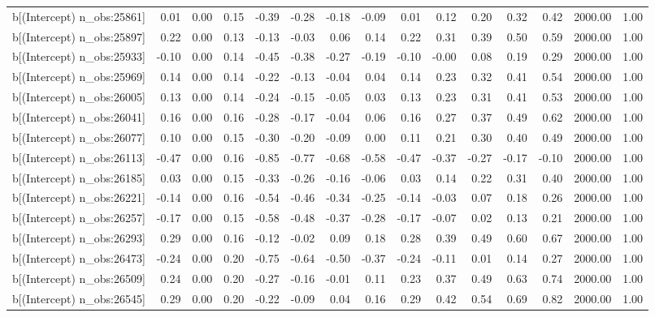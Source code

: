 \begin{table}[ht]
\begin{tabular}{rrrrrrrrrrrrrrr}
  b[(Intercept) n\_obs:25861] & 0.01 & 0.00 & 0.15 & -0.39 & -0.28 & -0.18 & -0.09 & 0.01 & 0.12 & 0.20 & 0.32 & 0.42 & 2000.00 & 1.00 \\ 
  b[(Intercept) n\_obs:25897] & 0.22 & 0.00 & 0.13 & -0.13 & -0.03 & 0.06 & 0.14 & 0.22 & 0.31 & 0.39 & 0.50 & 0.59 & 2000.00 & 1.00 \\ 
  b[(Intercept) n\_obs:25933] & -0.10 & 0.00 & 0.14 & -0.45 & -0.38 & -0.27 & -0.19 & -0.10 & -0.00 & 0.08 & 0.19 & 0.29 & 2000.00 & 1.00 \\ 
  b[(Intercept) n\_obs:25969] & 0.14 & 0.00 & 0.14 & -0.22 & -0.13 & -0.04 & 0.04 & 0.14 & 0.23 & 0.32 & 0.41 & 0.54 & 2000.00 & 1.00 \\ 
  b[(Intercept) n\_obs:26005] & 0.13 & 0.00 & 0.14 & -0.24 & -0.15 & -0.05 & 0.03 & 0.13 & 0.23 & 0.31 & 0.41 & 0.53 & 2000.00 & 1.00 \\ 
  b[(Intercept) n\_obs:26041] & 0.16 & 0.00 & 0.16 & -0.28 & -0.17 & -0.04 & 0.06 & 0.16 & 0.27 & 0.37 & 0.49 & 0.62 & 2000.00 & 1.00 \\ 
  b[(Intercept) n\_obs:26077] & 0.10 & 0.00 & 0.15 & -0.30 & -0.20 & -0.09 & 0.00 & 0.11 & 0.21 & 0.30 & 0.40 & 0.49 & 2000.00 & 1.00 \\ 
  b[(Intercept) n\_obs:26113] & -0.47 & 0.00 & 0.16 & -0.85 & -0.77 & -0.68 & -0.58 & -0.47 & -0.37 & -0.27 & -0.17 & -0.10 & 2000.00 & 1.00 \\ 
  b[(Intercept) n\_obs:26185] & 0.03 & 0.00 & 0.15 & -0.33 & -0.26 & -0.16 & -0.06 & 0.03 & 0.14 & 0.22 & 0.31 & 0.40 & 2000.00 & 1.00 \\ 
  b[(Intercept) n\_obs:26221] & -0.14 & 0.00 & 0.16 & -0.54 & -0.46 & -0.34 & -0.25 & -0.14 & -0.03 & 0.07 & 0.18 & 0.26 & 2000.00 & 1.00 \\ 
  b[(Intercept) n\_obs:26257] & -0.17 & 0.00 & 0.15 & -0.58 & -0.48 & -0.37 & -0.28 & -0.17 & -0.07 & 0.02 & 0.13 & 0.21 & 2000.00 & 1.00 \\ 
  b[(Intercept) n\_obs:26293] & 0.29 & 0.00 & 0.16 & -0.12 & -0.02 & 0.09 & 0.18 & 0.28 & 0.39 & 0.49 & 0.60 & 0.67 & 2000.00 & 1.00 \\ 
  b[(Intercept) n\_obs:26473] & -0.24 & 0.00 & 0.20 & -0.75 & -0.64 & -0.50 & -0.37 & -0.24 & -0.11 & 0.01 & 0.14 & 0.27 & 2000.00 & 1.00 \\ 
  b[(Intercept) n\_obs:26509] & 0.24 & 0.00 & 0.20 & -0.27 & -0.16 & -0.01 & 0.11 & 0.23 & 0.37 & 0.49 & 0.63 & 0.74 & 2000.00 & 1.00 \\ 
  b[(Intercept) n\_obs:26545] & 0.29 & 0.00 & 0.20 & -0.22 & -0.09 & 0.04 & 0.16 & 0.29 & 0.42 & 0.54 & 0.69 & 0.82 & 2000.00 & 1.00 \\ 

\end{tabular}
\end{table}
